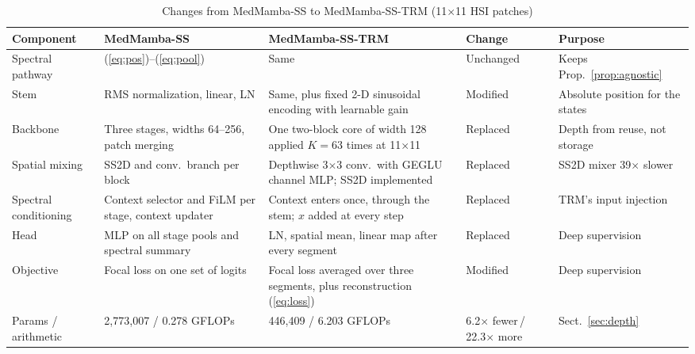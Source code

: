 \documentclass{svproc}
\begin{document}
\begin{table}[!htb]
\caption{Changes from MedMamba-SS to MedMamba-SS-TRM (11$\times$11 HSI patches)}
\label{tab:chg-trm}
\centering\scriptsize
\setlength{\tabcolsep}{3pt}
\begin{tabular}{@{}L{1.8cm}L{2.6cm}L{2.9cm}L{1.7cm}L{1.8cm}@{}}
\toprule
Component & MedMamba-SS & MedMamba-SS-TRM & Change & Purpose \\
\midrule
Spectral pathway & (\ref{eq:pos})--(\ref{eq:pool}) & Same & Unchanged & Keeps Prop.~\ref{prop:agnostic} \\
Stem & RMS normalization, linear, LN & Same, plus fixed 2-D sinusoidal encoding with learnable gain & Modified & Absolute position for the states \\
Backbone & Three stages, widths 64--256, patch merging & One two-block core of width 128 applied $K = 63$ times at 11$\times$11 & Replaced & Depth from reuse, not storage \\
Spatial mixing & SS2D and conv.\ branch per block & Depthwise 3$\times$3 conv.\ with GEGLU channel MLP; SS2D implemented & Replaced & SS2D mixer 39$\times$ slower \\
Spectral conditioning & Context selector and FiLM per stage, context updater & Context enters once, through the stem; $x$ added at every step & Replaced & TRM's input injection \\
Head & MLP on all stage pools and spectral summary & LN, spatial mean, linear map after every segment & Replaced & Deep supervision \\
Objective & Focal loss on one set of logits & Focal loss averaged over three segments, plus reconstruction (\ref{eq:loss}) & Modified & Deep supervision \\
Params / arithmetic & 2,773,007 / 0.278 GFLOPs & 446,409 / 6.203 GFLOPs & 6.2$\times$ fewer\,/ 22.3$\times$ more & Sect.~\ref{sec:depth} \\
\bottomrule
\end{tabular}
\end{table}
\end{document}
